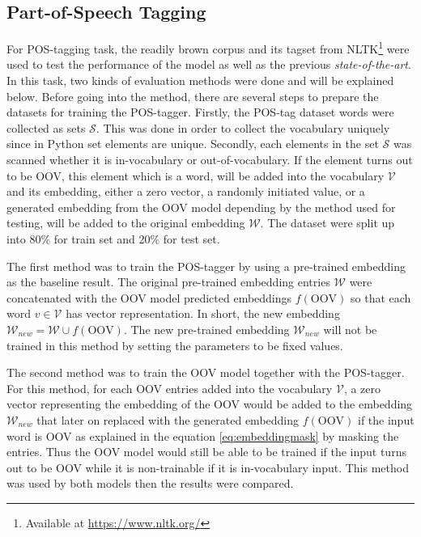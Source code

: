     \subsection{Part-of-Speech Tagging}
        For POS-tagging task, the readily brown corpus and its tagset
        from NLTK\footnote{Available at \url{https://www.nltk.org/}}
        were used to test the performance of the model as well as the
        previous \textit{state-of-the-art}. In this task, two kinds of
        evaluation methods were done and will be explained below.
        Before going into the method, there are several steps to
        prepare the datasets for training the POS-tagger. Firstly, the
        POS-tag dataset words were collected as sets $\mathcal{S}$.
        This was done in order to collect the vocabulary uniquely
        since in Python set elements are unique. Secondly, each
        elements in the set $\mathcal{S}$ was scanned whether it is
        in-vocabulary or out-of-vocabulary. If the element turns out
        to be OOV, this element which is a word, will be added into
        the vocabulary $\mathcal{V}$ and its embedding, either a zero
        vector, a randomly initiated value, or a generated embedding
        from the OOV model depending by the method used for testing,
        will be added to the original embedding $\mathcal{W}$. The
        dataset were split up into 80\% for train set and 20\% for
        test set.

        The first method was to train the POS-tagger by using a
        pre-trained embedding as the baseline result. The original
        pre-trained embedding entries $\mathcal{W}$ were concatenated
        with the OOV model predicted embeddings $f(\text{OOV})$ so
        that each word $v \in \mathcal{V}$ has vector representation.
        In short, the new embedding $\mathcal{W}_{new} = \mathcal{W}
        \cup f(\text{OOV})$. The new pre-trained embedding
        $\mathcal{W}_{new}$ will not be trained in this method by
        setting the parameters to be fixed values.

        The second method was to train the OOV model together with the
        POS-tagger. For this method, for each OOV entries added into
        the vocabulary $\mathcal{V}$, a zero vector representing the
        embedding of the OOV would be added to the embedding
        $\mathcal{W}_{new}$ that later on replaced with the generated
        embedding $f(\text{OOV})$ if the input word is OOV as
        explained in the equation \ref{eq:embeddingmask} by masking
        the entries. Thus the OOV model would still be able to be
        trained if the input turns out to be OOV while it is
        non-trainable if it is in-vocabulary input. This method was
        used by both models then the results were compared.

